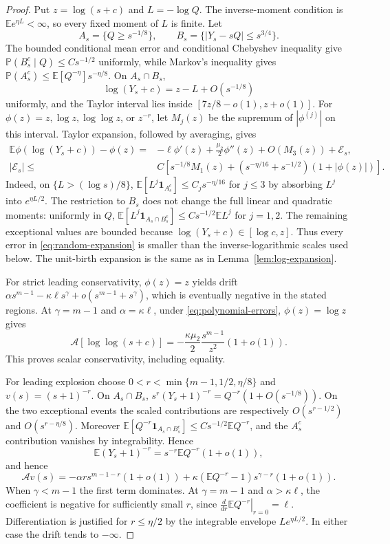 \documentclass[11pt,a4paper]{article}
\theoremstyle{remark}\newtheorem{remark}[theorem]{Remark}
\newcommand{\E}{\mathbb E}
\newcommand{\Prob}{\mathbb P}
\newcommand{\A}{\mathcal A}
\newcommand{\ind}{\mathbf 1}
\begin{document}
\begin{proof}
Put $z=\log(s+c)$ and $L=-\log Q$. The inverse-moment condition is
$\E e^{\eta L}<\infty$, so every fixed moment of $L$ is finite. Let
\[
A_s=\{Q\ge s^{-1/8}\},\qquad
B_s=\{|Y_s-sQ|\le s^{3/4}\}.
\]
The bounded conditional mean error and conditional Chebyshev inequality give
$\Prob(B_s^c\mid Q)\le Cs^{-1/2}$ uniformly, while Markov's inequality gives
$\Prob(A_s^c)\le \E[Q^{-\eta}]s^{-\eta/8}$.
On $A_s\cap B_s$,
\[
\log(Y_s+c)=z-L+O(s^{-1/8})
\]
uniformly, and the Taylor interval lies inside
$[7z/8-o(1),z+o(1)]$. For
$\phi(z)=z,\log z,\log\log z$, or $z^{-r}$, let $M_j(z)$ be the supremum of
$|\phi^{(j)}|$ on this interval. Taylor expansion, followed by averaging, gives
\begin{align}
\E\phi(\log(Y_s+c))-\phi(z)
={}&-\ell\phi'(z)+\frac{\mu_2}{2}\phi''(z)
       +O(M_3(z))+\mathcal E_s,\label{eq:random-expansion}\\
|\mathcal E_s|
\le{}& C\left[s^{-1/8}M_1(z)
       +(s^{-\eta/16}+s^{-1/2})(1+|\phi(z)|)\right].\nonumber
\end{align}
Indeed, on $\{L>(\log s)/8\}$,
$\E[L^j\ind_{A_s^c}]\le C_js^{-\eta/16}$ for $j\le3$ by absorbing
$L^j$ into $e^{\eta L/2}$. The restriction to $B_s$ does not change the full
linear and quadratic moments: uniformly in $Q$,
$\E[L^j\ind_{A_s\cap B_s^c}]\le Cs^{-1/2}\E L^j$ for $j=1,2$.
The remaining exceptional values are bounded because $\log(Y_s+c)\in[\log c,z]$.
Thus every error in \eqref{eq:random-expansion} is smaller than the inverse-logarithmic scales used below. The unit-birth expansion is the same as in Lemma~\ref{lem:log-expansion}.

For strict leading conservativity, $\phi(z)=z$ yields drift
$\alpha s^{m-1}-\kappa\ell s^\gamma+o(s^{m-1}+s^\gamma)$, which is eventually negative in the stated regions. At $\gamma=m-1$ and $\alpha=\kappa\ell$, under \eqref{eq:polynomial-errors}, $\phi(z)=\log z$ gives
\begin{equation}\label{eq:random-critical}
\A[\log\log(s+c)]
=-\frac{\kappa\mu_2}{2}\frac{s^{m-1}}{z^2}(1+o(1)).
\end{equation}
This proves scalar conservativity, including equality.

For leading explosion choose $0<r<\min\{m-1,1/2,\eta/8\}$ and $v(s)=(s+1)^{-r}$. On $A_s\cap B_s$,
$s^r(Y_s+1)^{-r}=Q^{-r}(1+O(s^{-1/8}))$. On the two exceptional events the scaled contributions are respectively $O(s^{r-1/2})$ and $O(s^{r-\eta/8})$. Moreover
$\E[Q^{-r}\ind_{A_s\cap B_s^c}]\le Cs^{-1/2}\E Q^{-r}$, and the
$A_s^c$ contribution vanishes by integrability. Hence
\[
\E(Y_s+1)^{-r}=s^{-r}\E Q^{-r}(1+o(1)),
\]
and hence
\[
\A v(s)=-\alpha r s^{m-1-r}(1+o(1))
 +\kappa(\E Q^{-r}-1)s^{\gamma-r}(1+o(1)).
\]
When $\gamma<m-1$ the first term dominates. At $\gamma=m-1$ and $\alpha>\kappa\ell$, the coefficient is negative for sufficiently small $r$, since
$\left.\frac{d}{dr}\E Q^{-r}\right|_{r=0}=\ell$. Differentiation is justified for $r\le\eta/2$ by the integrable envelope $Le^{\eta L/2}$. In either case the drift tends to $-\infty$.


\end{proof}
\end{document}

